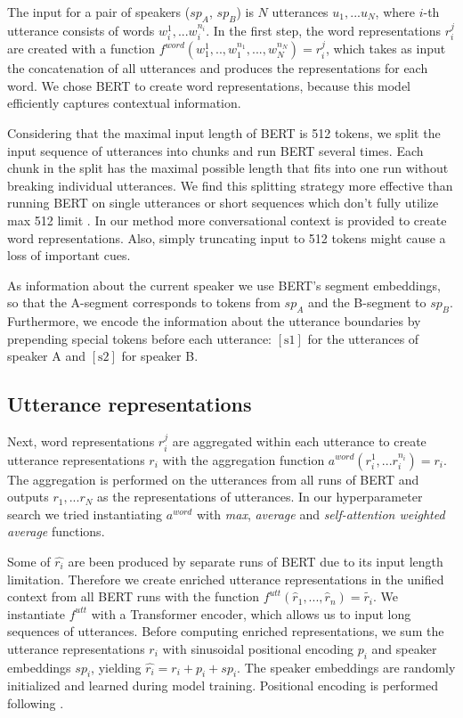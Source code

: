 The input for a pair of speakers ($sp_A$, $sp_B$) is $N$ utterances $u_1, ... u_N$, where $i$-th utterance consists of words $w_i^1, ... w_i^{n_i}$. 
In the first step, the word representations $r_i^j$ are created with a function $f^{word}(w_1^1,..,w_1^{n_1},...,w_N^{n_N})=r_i^j$, which takes as input the concatenation of all utterances and produces the representations for each word. We chose BERT \cite{devlin2019bert} to create word representations, because this model efficiently captures contextual information.

Considering that the maximal input length of BERT is 512 tokens, we split the input sequence of utterances into chunks and run BERT several times. Each chunk in the split has the maximal possible length that fits into one run without breaking individual utterances. We find this splitting strategy more effective than running BERT on single utterances \cite{chen2020mpdd} or short sequences which don't fully utilize max 512 limit \cite{jia2020ddrel}. In our method more conversational context is provided to create word representations. Also, simply truncating input to 512 tokens \cite{lu2020improving} might cause a loss of important cues. 

As information about the current speaker we use BERT's segment embeddings, so that the A-segment corresponds to tokens from $sp_A$ and the B-segment to $sp_B$.
Furthermore, we encode the information about the utterance boundaries by prepending special tokens before each utterance: $[\textrm{s1}]$ for the utterances of speaker A and $[\textrm{s2}]$ for speaker B. 

\subsection{Utterance representations}

Next, word representations $r_i^j$ are aggregated within each utterance to create utterance representations $r_i$ with the aggregation function $a^{word}(r_i^1,...r_i^{n_i})=r_i$. The aggregation is performed on the utterances from all runs of BERT and outputs $r_1, ... r_N$ as the representations of utterances.
In our hyperparameter search we tried instantiating $a^{word}$ with \textit{max}, \textit{average} and \textit{self-attention weighted average} functions.

Some of $\hat{r_i}$ are been produced by separate runs of BERT due to its input length limitation. Therefore we create enriched utterance representations in the unified context from all BERT runs with the function $f^{utt}(\hat{r}_1,...,\hat{r}_n) = \tilde{r_i}$. We instantiate $f^{utt}$ with a Transformer encoder, which allows us to input long sequences of utterances. 
Before computing enriched representations, we sum the utterance representations $r_i$ with sinusoidal positional encoding $p_i$ and speaker embeddings $sp_i$, yielding $\hat{r_i} = r_i + p_i + sp_i$. The speaker embeddings are randomly initialized and learned during model training. Positional encoding is performed following \citet{vaswani2017attention}. 

